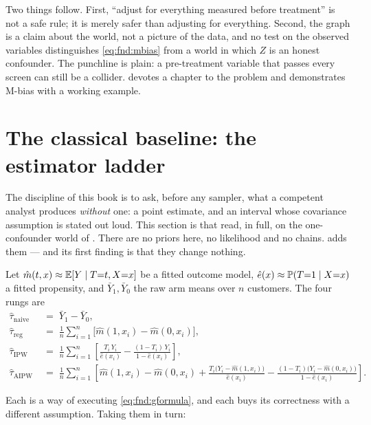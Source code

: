 Two things follow. First, ``adjust for everything measured before treatment'' is not a safe
rule; it is merely safer than adjusting for everything. Second, the graph is a claim about the
world, not a picture of the data, and no test on the observed variables distinguishes
\cref{eq:fnd:mbias} from a world in which $Z$ is an honest confounder. The punchline is plain: a
pre-treatment variable that passes every screen can still be a collider.  devotes a
chapter to the problem and demonstrates M-bias with a working example.

\section{The classical baseline: the estimator ladder}
\label{sec:fnd:classical}

The discipline of this book is to ask, before any sampler, what a competent analyst produces
\emph{without} one: a point estimate, and an interval whose covariance assumption is stated out
loud. This section is that read, in full, on the one-confounder world of
. There are no priors here, no likelihood and no chains.
 adds them --- and its first finding is that they change nothing.

Let $\hat m(t, x) \approx \operatorname{\mathbb{E}}[Y \mid T{=}t, X{=}x]$ be a fitted outcome model,
$\hat e(x) \approx \operatorname{\mathbb{P}}(T{=}1 \mid X{=}x)$ a fitted propensity, and $\bar Y_1, \bar Y_0$ the raw
arm means over $n$ customers. The four rungs are
%
\begin{align}
  \hat\tau_{\text{naive}} &\;=\; \bar Y_1 - \bar Y_0, \label{eq:fnd:rung_naive}\\[2pt]
  \hat\tau_{\text{reg}}   &\;=\; \frac1n \sum_{i=1}^{n}
     \big[\hat m(1, x_i) - \hat m(0, x_i)\big], \label{eq:fnd:reg}\\[2pt]
  \hat\tau_{\text{IPW}}   &\;=\; \frac1n \sum_{i=1}^{n}
     \left[\frac{T_i\,Y_i}{\hat e(x_i)} - \frac{(1 - T_i)\,Y_i}{1 - \hat e(x_i)}\right],
     \label{eq:fnd:ipw}\\[2pt]
  \hat\tau_{\text{AIPW}}  &\;=\; \frac1n \sum_{i=1}^{n}
     \left[\hat m(1, x_i) - \hat m(0, x_i)
      + \frac{T_i\big(Y_i - \hat m(1, x_i)\big)}{\hat e(x_i)}
      - \frac{(1 - T_i)\big(Y_i - \hat m(0, x_i)\big)}{1 - \hat e(x_i)}\right].
     \label{eq:fnd:aipw}
\end{align}

Each is a way of executing \cref{eq:fnd:gformula}, and each buys its correctness with a
different assumption. Taking them in turn:

